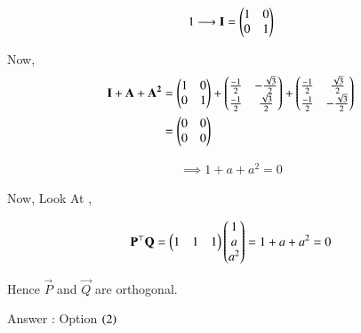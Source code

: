 \documentclass[journal]{IEEEtran}
\numberwithin{equation}{enumi}
\numberwithin{figure}{enumi}
\begin{document}
\begin{align}
    1 \longrightarrow \mathbf{I} = \begin{pmatrix}1&0\\0&1\end{pmatrix}
\end{align}

Now, 
\begin{align}
    \mathbf{I} + \mathbf{A} + \mathbf{A^2} &= \begin{pmatrix}1&0\\0&1\end{pmatrix} + \begin{pmatrix}\frac{-1}{2}&-\frac{\sqrt{3}}{2}\\\frac{-1}{2} & \frac{\sqrt{3}}{2}\end{pmatrix} + \begin{pmatrix}\frac{-1}{2}&\frac{\sqrt{3}}{2}\\\frac{-1}{2} & -\frac{\sqrt{3}}{2}\end{pmatrix}\\ 
    &= \begin{pmatrix}0&0\\0&0\end{pmatrix}
\end{align}

\begin{align}
    \implies 1 + a + a^2 = 0 
\end{align}

Now, Look At , 

\begin{align}
    \mathbf{P}^{\top}\mathbf{Q} = \begin{pmatrix}1&1&1\end{pmatrix}\begin{pmatrix}1\\a\\a^2\end{pmatrix} = 1 + a + a^2 = 0 
\end{align}

Hence $\vec{P}$ and $\vec{Q}$ are orthogonal. 

Answer  : Option $\left(2\right)$
\end{document}
